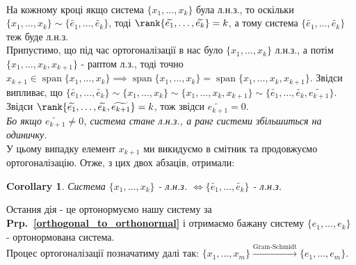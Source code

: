\documentclass[a4paper, 10pt]{article}
\theoremstyle{theoremdd}
\newtheorem{corollary}[theorem]{Corollary}
\newcommand\prpref[1]{\textbf{Prp.~\ref{#1}}}
\DeclareMathOperator{\linspan}{span}
\begin{document}
\bigskip \\
На кожному кроці якщо система $\{x_1,\dots,x_k\}$ була л.н.з., то оскільки $\{x_1,\dots,x_k\} \sim \{\widetilde{e_1},\dots,\widetilde{e_k}\}$, тоді $\rank \{\widetilde{e_1},\dots,\widetilde{e_k}\} = k$, а тому система $\{\widetilde{e_1},\dots,\widetilde{e_k}\}$ теж буде л.н.з.
\bigskip \\
Припустимо, що під час ортогоналізації в нас було $\{x_1,\dots,x_k\}$ л.н.з., а потім $\{x_1,\dots,x_k, x_{k+1}\}$ - раптом л.з., тоді точно $x_{k+1} \in \linspan \{x_1,\dots,x_k\} \implies \linspan \{x_1,\dots,x_k\} = \linspan \{x_1,\dots,x_k,x_{k+1}\}$. Звідси випливає, що $\{\widetilde{e_1},\dots,\widetilde{e_k}\} \sim \{x_1,\dots,x_k\} \sim \{x_1,\dots,x_k,x_{k+1}\} \sim \{\widetilde{e_1},\dots,\widetilde{e_k},\widetilde{e_{k+1}}\}$. Звідси $\rank \{\widetilde{e_1},\dots,\widetilde{e_k},\widetilde{e_{k+1}}\} = k$, тож звідси $\widetilde{e_{k+1}} = 0$.\\
\textit{Бо якщо $\widetilde{e_{k+1}} \neq 0$, система стане л.н.з., а ранг системи збільшиться на одиничку.}\\
У цьому випадку елемент $x_{k+1}$ ми викидуємо в смітник та продовжуємо ортогоналізацію. Отже, з цих двох абзаців, отримали:

\begin{corollary}
Система $\{x_1,\dots,x_k\}$ - л.н.з. $\iff \{\widetilde{e_1},\dots,\widetilde{e_k}\}$ - л.н.з.
\end{corollary}
\noindent
Остання дія - це ортонормуємо нашу систему за \prpref{orthogonal_to_orthonormal} і отримаємо бажану систему $\{e_1,\dots,e_k\}$ - ортонормована система.
\bigskip \\
Процес ортогоналізації позначатиму далі так: $\{x_1,\dots,x_m\} \xrightarrow{\text{Gram-Schmidt}} \{e_1,\dots,e_m\}$.
\end{document}
